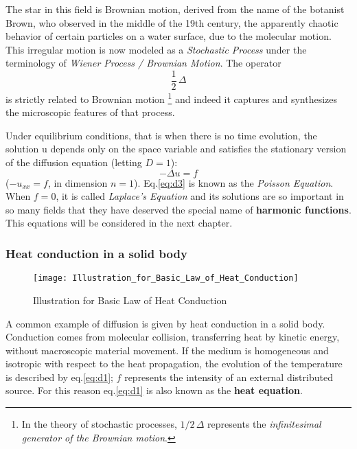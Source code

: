 \documentclass[../main.tex]{subfiles}
\begin{document}
The star in this field is Brownian motion, derived from the name of the botanist Brown, who observed in the middle of the 19th century, the apparently chaotic behavior of certain particles on a water surface, due to the molecular motion. This irregular motion is now modeled as a \textit{Stochastic Process} under the terminology of \textit{Wiener Process / Brownian Motion}. The operator
\begin{equation*}
    \frac{1}{2} \, \Delta
\end{equation*}
is strictly related to Brownian motion \footnote{In the theory of stochastic processes, $1/2 \, \Delta$ represents the \textit{infinitesimal generator of the Brownian motion}.} and indeed it captures and synthesizes the microscopic features of that process.

Under equilibrium conditions, that is when there is no time evolution, the solution u depends only on the space variable and satisfies the stationary version of the diffusion equation (letting $D = 1$):
\begin{equation}
    - \Delta u = f \label{eq:d3}
\end{equation}
($− u_{xx} = f$, in dimension $n = 1$). Eq.\ref{eq:d3} is known as the \textit{Poisson Equation}. When $f = 0$, it is called \textit{Laplace’s Equation} and its solutions are so important in so many fields that they have deserved the special name of \textbf{harmonic functions}. This equations will be considered in the next chapter.

\subsubsection{Heat conduction in a solid body}

\begin{SCfigure}[0.6][h!]
    \texttt{[image: Illustration\_for\_Basic\_Law\_of\_Heat\_Conduction]}
    \caption{Illustration for Basic Law of Heat Conduction}
    \label{fig:d1}
\end{SCfigure}

A common example of diffusion is given by heat conduction in a solid body. Conduction comes from molecular collision, transferring heat by kinetic energy, without macroscopic material movement. If the medium is homogeneous and isotropic with respect to the heat propagation, the evolution of the temperature is described by eq.\ref{eq:d1}; $f$ represents the intensity of an external distributed source. For this reason eq.\ref{eq:d1} is also known as the \textbf{heat equation}.
\end{document}
